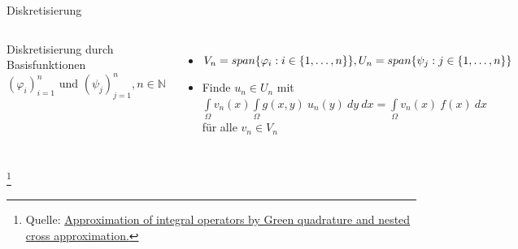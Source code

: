 \documentclass[10pt]{beamer}
\let\svthefootnote\thefootnote
\begin{document}
\begin{frame}{Diskretisierung}
  \begin{columns}
      Diskretisierung durch Basisfunktionen\\
      \({(\varphi_{i})}_{i = 1}^{n} \text{ und }
        {(\psi_{j})}_{j = 1}^{n}, n \in \mathbb{N}\)
      \begin{itemize}
        \item \(V_{n} = span\{ \varphi_{i} : i \in \{ 1, \hdots, n\}\}, \newline
               U_{n} = span\{ \psi_{j} : j \in \{ 1, \hdots, n\}\}\)
        \item Finde \(u_{n} \in U_{n}\) mit\\
        \(\int\limits_{\Omega} v_{n}(x) \int\limits_{\Omega} g(x,y) \
        u_{n}(y) \ dy \ dx = \int\limits_{\Omega} v_{n}(x) \ f(x) \ dx\)\\
        für alle \(v_{n} \in V_{n}\)
      \end{itemize}
      \centering
      \includegraphics[width=1.5\linewidth]{figures/fg-sphere-tri.pdf}
  \end{columns}
  \footnotesize
  \let\thefootnote\relax\footnote{Quelle: \href{https://link.springer.com/article/10.1007\%2Fs00211-015-0757-y}{Approximation of integral operators by Green quadrature and nested cross approximation.}}
  \addtocounter{footnote}{-1}\let\thefootnote\svthefootnote\relax
  \normalsize
\end{frame}
\end{document}
